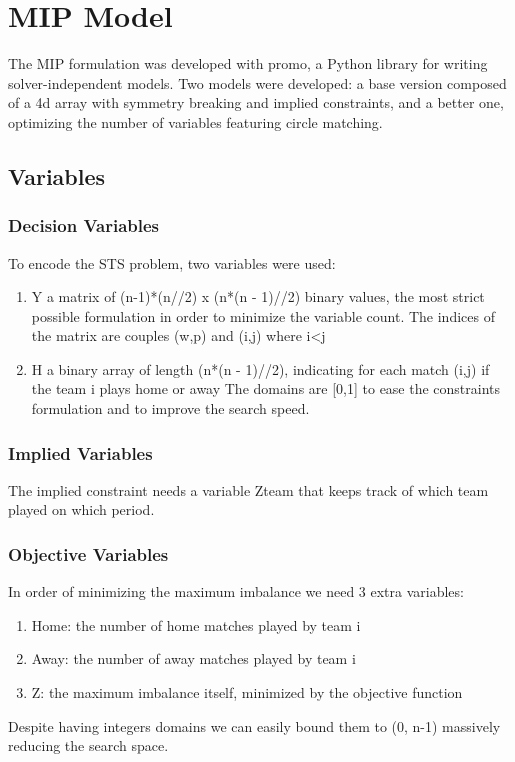 

\section{MIP Model}
The MIP formulation was developed with promo, a Python library for writing solver-independent models.
Two models were developed: a base version composed of a 4d array with symmetry breaking and implied constraints, and a better one, optimizing the number of variables featuring circle matching.

\subsection{Variables}
\subsubsection*{Decision Variables}
To encode the STS problem, two variables were used:
\begin{enumerate}
\item Y a matrix of (n-1)*(n//2) x (n*(n - 1)//2) binary values, the most strict possible formulation in order to minimize the variable count. The indices of the matrix are couples (w,p) and (i,j) where i<j
\item H a binary array of length (n*(n - 1)//2), indicating for each match (i,j) if the team i plays home or away  
The domains are [0,1] to ease the constraints formulation and to improve the search speed.
\end{enumerate}
\subsubsection*{Implied Variables}
The implied constraint needs a variable Zteam that keeps track of which team played on which period.
\subsubsection*{Objective Variables}
In order of minimizing the maximum imbalance we need 3 extra variables:
\begin{enumerate}
\item Home: the number of home matches played by team i
\item Away: the number of away matches played by team i
\item Z: the maximum imbalance itself, minimized by the objective function
\end{enumerate}
Despite having integers domains we can easily bound them to (0, n-1) massively reducing the search space.



